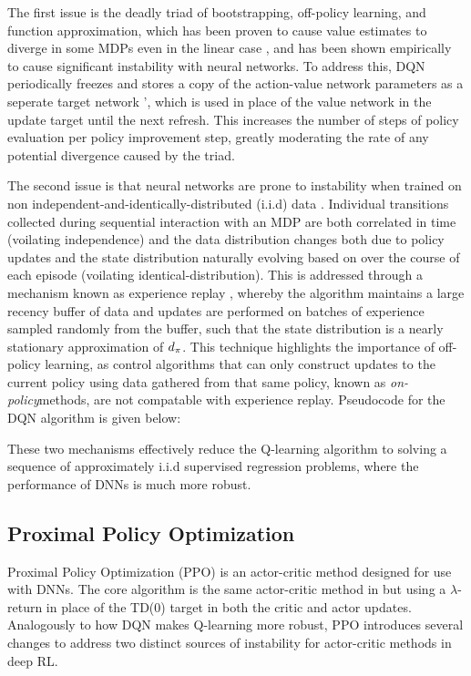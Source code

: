The first issue is the deadly triad \cite{sutton1998introduction} of bootstrapping, off-policy learning, and function approximation, which has been proven to cause value estimates to diverge in some MDPs even in the linear case , and has been shown empirically to cause significant instability with neural networks. %
To address this, DQN periodically freezes and stores a copy of the action-value network parameters \qparams as a seperate target network \qparams', which is used in place of the value network in the update target until the next refresh. This increases the number of steps of policy evaluation per policy improvement step, greatly moderating the rate of any potential divergence caused by the triad. 

The second issue is that neural networks are prone to instability when trained on non independent-and-identically-distributed (i.i.d) data . Individual transitions collected during sequential interaction with an MDP are both correlated in time (voilating independence) and the data distribution changes both due to policy updates and the state distribution naturally evolving based on \dynamics over the course of each episode (voilating identical-distribution). This is addressed through a mechanism known as experience replay , whereby the algorithm maintains a large recency buffer of data and updates are performed on batches of experience sampled randomly from the buffer, such that the state distribution is a nearly stationary approximation of $d_{\pi}$.  %
This technique highlights the importance of off-policy learning, as control algorithms that can only construct updates to the current policy using data gathered from that same policy, known as \textit{on-policy}methods, are not compatable with experience replay. %
Pseudocode for the DQN algorithm is given below:

These two mechanisms effectively reduce the Q-learning algorithm to solving a sequence of approximately i.i.d supervised regression problems, where the performance of DNNs is much more robust. 
\subsection{Proximal Policy Optimization}
Proximal Policy Optimization (PPO)  is an actor-critic method designed for use with DNNs. The core algorithm is the same actor-critic method in %
but using a $\lambda$-return in place of the TD(0) target in both the critic and actor updates. Analogously to how DQN makes Q-learning more robust, PPO introduces several changes to address two distinct sources of instability for actor-critic methods in deep RL.

